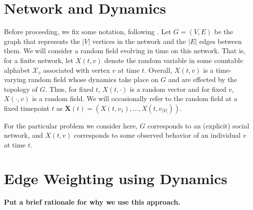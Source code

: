 \documentclass[12pt]{article}
\begin{document}
 

\section{Network and Dynamics}

Before proceeding, we fix some notation, following \cite{kolaczyk2009statistical}. Let $G = (V, E)$ be the graph that represents the $|V|$ vertices in the network and the $|E|$ edges between them. We will consider a random field evolving in time on this network. That is, for a finite network, let $X(t, v)$ denote the random variable in some countable alphabet $\mathcal{X}_{v}$ associated with vertex $v$ at time $t$. Overall, $X(t, v)$ is a time-varying random field whose dynamics take place on $G$ and are effected by the topology of $G$. Thus, for fixed $t$, $X(t, \cdot)$ is a random vector and for fixed $v$, $X(\cdot, v)$ is a random field. We will occasionally refer to the random field at a fixed timepoint $t$ as $\mathbf{X}(t) = (X(t, v_{1}), \ldots, X(t, v_{|V|})).$

For the particular problem we consider here, $G$ corresponds to an (explicit) social network, and $X(t,v)$ corresponds to some observed behavior of an individual $v$ at time $t$.

\section{Edge Weighting using Dynamics}

\textbf{Put a brief rationale for why we use this approach.}
\end{document}
